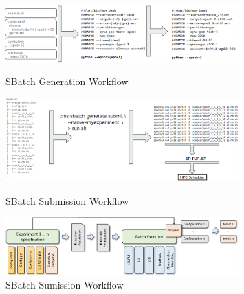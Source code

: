 \begin{figure}[htb]
    \centering
    \includegraphics[width=0.8\textwidth]{images/sbatch-template.png}
    \caption{SBatch Generation Workflow}\label{fig:sbatch}

    \centering
    \includegraphics[width=0.8\textwidth]{images/sbatch-submit.png}
    \caption{SBatch Submission Workflow}\label{fig:sbatch-submit}

    \centering
    \includegraphics[width=0.8\textwidth]{images/sbatch.pdf}
    \caption{SBatch Sumission Workflow}\label{fig:sbatch-2}
\end{figure}



